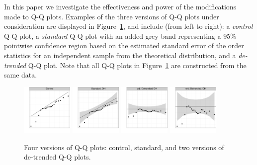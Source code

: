 \documentclass{article}\usepackage[]{graphicx}\usepackage[]{color}
\newcommand{\hh}[1]{{\color{magenta} #1}}
\newcommand{\alnote}[1]{\todo[inline,color=green!40]{#1}}
\begin{document}
In this paper we investigate the effectiveness and power of the modifications made to Q-Q plots.
Examples of the three versions of Q-Q plots under consideration are displayed in Figure~\ref{qqplots}, and include (from left to right): a \emph{control} Q-Q plot, a \emph{standard} Q-Q plot with an added grey band representing a 95\% pointwise confidence region \citep{Davison:1997}
based on the estimated standard error of the order statistics for an independent sample from the theoretical distribution, and a \emph{de-trended} Q-Q plot. Note that all Q-Q plots in Figure~\ref{qqplots} are constructed from the same data. 

\begin{figure}
\centering
\includegraphics[width=0.22\textwidth]{qqplots-1}
\includegraphics[width=0.22\textwidth]{qqplots-2}
\includegraphics[width=0.22\textwidth]{qqplots-3}
\includegraphics[width=0.22\textwidth]{qqplots-4}
\caption{ \label{qqplots} \hh{Four} versions of Q-Q plots: control, standard, and \hh{two versions of} de-trended \hh{Q-Q plots}.}
\end{figure}
\end{document}
